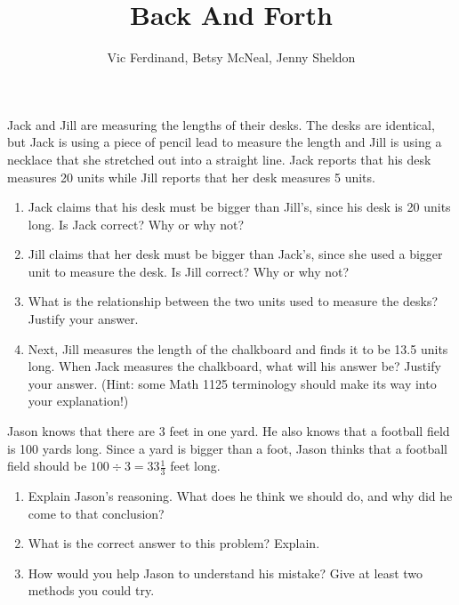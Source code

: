 \documentclass{ximera}
\title{Back And Forth}
\author{Vic Ferdinand, Betsy McNeal, Jenny Sheldon}
\begin{document}
\begin{abstract}\end{abstract}
\maketitle




\begin{problem} \label{BackAndForth1}
    Jack and Jill are measuring the lengths of their desks.  The desks are identical, but Jack is using a piece of pencil lead to measure the length and Jill is using a necklace that she stretched out into a straight line.  Jack reports that his desk measures 20 units while Jill reports that her desk measures 5 units.
    \begin{enumerate}
        \item Jack claims that his desk must be bigger than Jill's, since his desk is 20 units long.  Is Jack correct?  Why or why not?
        \item Jill claims that her desk must be bigger than Jack's, since she used a bigger unit to measure the desk.  Is Jill correct?  Why or why not?
        \item What is the relationship between the two units used to measure the desks?  Justify your answer.
        \item Next, Jill measures the length of the chalkboard and finds it to be 13.5 units long.  When Jack measures the chalkboard, what will his answer be?  Justify your answer.  (Hint: some Math 1125 terminology should make its way into your explanation!)
    \end{enumerate}
    

\end{problem}

\begin{problem} \label{BackAndForth2}
    Jason knows that there are 3 feet in one yard.  He also knows that a football field is 100 yards long.  Since a yard is bigger than a foot, Jason thinks that a football field should be $100 \div 3 = 33 \frac{1}{3}$ feet long.
    \begin{enumerate}
    \item Explain Jason's reasoning.  What does he think we should do, and why did he come to that conclusion?
    \item What is the correct answer to this problem? Explain.
    \item How would you help Jason to understand his mistake?  Give at least two methods you could try.
    \end{enumerate}
   
    

\end{problem}
\end{document}
